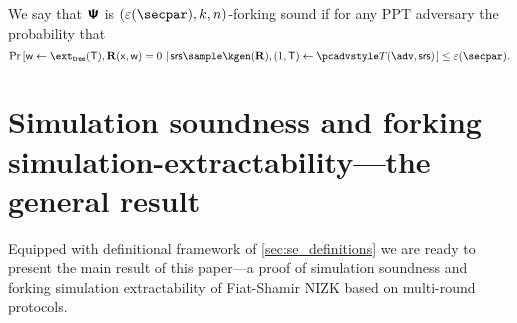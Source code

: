\documentclass[runningheads,11pt]{llncs}
\begin{document}
\begin{definition}
  \begin{figure}
    \centering
  \end{figure}
%
  We say that $\bm{\mathsf{\Psi}}$ is $(\eps(\secpar), k,n)$-forking sound if
  for any PPT adversary the probability that
  \[
    \Pr\left[
         \wit \gets \extt(\tree), 
         \REL(\inp, \wit) = 0
      \,\left|\,
           \srs \sample \kgen(\REL), 
           (1, \tree) \gets \tdv(\adv, \srs)
      \right.\right] \leq \eps(\secpar).
      \]
\end{definition}

\section{Simulation soundness and forking simulation-extractability---the general result}
\label{sec:general}
Equipped with definitional framework of \cref{sec:se_definitions} we are ready
to present the main result of this paper---a proof of simulation soundness and
forking simulation extractability of Fiat-Shamir NIZK based on multi-round protocols.
\end{document}
